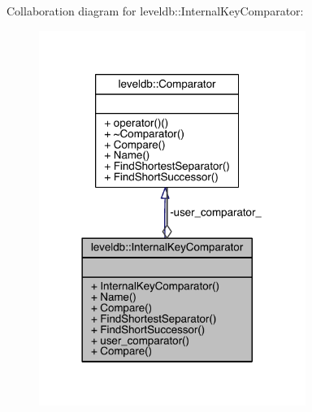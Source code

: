 Collaboration diagram for leveldb\+:\+:Internal\+Key\+Comparator\+:\nopagebreak
\begin{figure}[H]
\begin{center}
\leavevmode
\includegraphics[width=246pt]{classleveldb_1_1_internal_key_comparator__coll__graph}
\end{center}
\end{figure}
